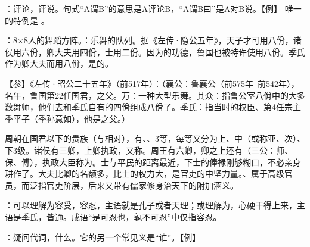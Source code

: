 {
\item {}：评论，评说。句式“A谓B”的意思是A评论B，“A谓B曰”是A对B说。【例】 唯一的特例是 。
\item {}：8×8人的舞蹈方阵。：乐舞的队列。据《左传·隐公五年》，天子才可用八佾，诸侯用六佾，卿大夫用四佾，士用二佾。因为的功德，鲁国也被特许使用八佾。季氏作为卿大夫而用八佾，是的。

【参】《左传·昭公二十五年》（前517年）：（襄公：鲁襄公（前575年--前542年），名午，鲁国第22任国君，之父。万：一种大型乐舞。其众：指鲁公室八佾中的大多数舞师，他们去和季氏自有的四佾组成八佾了。季氏：指当时的权臣、第4任宗主季平子（季孙意如），他是之父。）

周朝在国君以下的贵族（与相对），有、、3等，每等又分为上、中（或称亚、次）、下3级。诸侯有三卿，上卿执政，又称。周王有六卿，卿之上还有（三公：师、保、傅），执政大臣称为。士与平民的距离最近，下士的俸禄刚够糊口，不必亲身耕作了。大夫比卿的名额多，比士的权力大，是官吏的中坚力量。、属于高级官员，而泛指官吏阶层，后来又带有儒家修身治天下的附加涵义。

\item {}：可以理解为容受，容忍，主语就是孔子或者天理；或理解为，心硬干得上来，主语是季氏，皆通。成语“是可忍也，孰不可忍”中仅指容忍。
\item {}：疑问代词，什么。它的另一个常见义是“谁”。【例】 
}
{}


